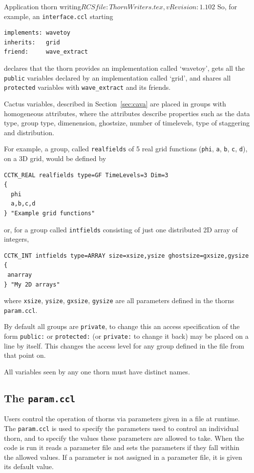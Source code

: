 \begin{cactuspart}{2}{Application thorn writing}{$RCSfile: ThornWriters.tex,v $}{$Revision: 1.102 $}
So, for example, an {\tt interface.ccl} starting
\begin{verbatim}
implements: wavetoy
inherits:   grid
friend:     wave_extract
\end{verbatim}
declares that the thorn provides an implementation called `wavetoy', gets
all the {\tt public} variables declared by an implementation called `grid', and
shares all {\tt protected} variables with {\tt wave\_extract} and its friends.

Cactus variables, described in Section~\ref{sec:cava} are placed
in groups with homogeneous attributes, where
the attributes describe properties such as the data type, group type,
dimenension, ghostsize, number of timelevels, type of staggering and
distribution.

For example, a group, called {\tt realfields} of 5 real grid
functions ({\tt phi}, {\tt a},
{\tt b}, {\tt c}, {\tt d}), on a 3D grid, would be defined by
\begin{verbatim}
CCTK_REAL realfields type=GF TimeLevels=3 Dim=3
{
  phi
  a,b,c,d
} "Example grid functions"\end{verbatim}
or, for a group called {\tt intfields} consisting of just one
distributed 2D array of integers,
\begin{verbatim}
CCTK_INT intfields type=ARRAY size=xsize,ysize ghostsize=gxsize,gysize
{
 anarray
} "My 2D arrays"
\end{verbatim}
where {\tt xsize}, {\tt ysize}, {\tt gxsize}, {\tt gysize} are all
parameters defined in the thorns {\tt param.ccl}.


By default all groups are {\tt private}, to change this an access
specification of the form {\tt public:} or {\tt protected:} (or
{\tt private:} to change it back) may be placed on a line by itself.  This
changes the access level for any group defined in the file from that point on.

All variables seen by any one thorn must have distinct names.

\subsection{The {\tt param.ccl}}

Users control the operation of thorns via parameters given in a file
at runtime.  The {\tt param.ccl}
is used to specify the parameters used to control an individual thorn, and
to specify the values these parameters are allowed to take.  When the code
is run it reads a parameter file and sets the parameters if they fall
within the allowed values. If a parameter is not assigned in a parameter
file, it is given its default value.


\end{cactuspart}

